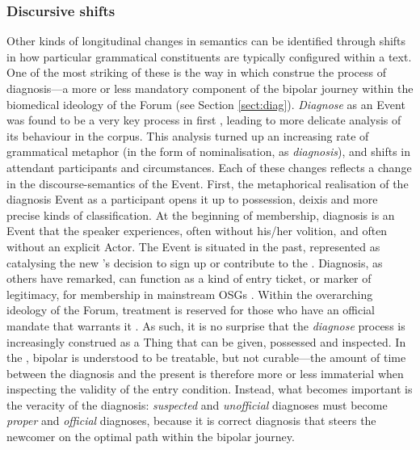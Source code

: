 \subsubsection{Discursive shifts}



Other kinds of longitudinal changes in semantics can be identified through shifts in how particular grammatical constituents are typically configured within a text. One of the most striking of these is the way in which  construe the process of diagnosis---a more or less mandatory component of the \gls{bipolar} journey within the biomedical ideology of the \gls{Forum} (see Section \ref{sect:diag}). \emph{Diagnose} as an Event was found to be a very key process in first , leading to more delicate analysis of its behaviour in the \gls{corpus}. This analysis turned up an increasing rate of grammatical metaphor (in the form of nominalisation, as \emph{diagnosis}), and shifts in attendant participants and circumstances. Each of these changes reflects a change in the \glspl{discourse-semantic} of the Event. First, the metaphorical realisation of the diagnosis Event as a participant opens it up to possession, deixis and more precise kinds of classification. At the beginning of membership, diagnosis is an Event that the speaker experiences, often without his\slash her volition, and often without an explicit Actor. The Event is situated in the past, represented as catalysing the new 's decision to sign up or contribute to the . Diagnosis, as others have remarked, can function as a kind of entry ticket, or marker of legitimacy, for membership in mainstream \glspl{OSG} \cite{stommel_use_2011}. Within the overarching ideology of the \gls{Forum}, treatment \cite[including the talk therapy provided by \gls{Forum} interaction itself---see][]{kaufman2016producing} is reserved for those who have an official mandate that warrants it \cite{vayreda_social_2009}. As such, it is no surprise that the \emph{diagnose} process is increasingly construed as a Thing that can be given, possessed and inspected. In the , \gls{bipolar} is understood to be treatable, but not curable---the amount of time between the diagnosis and the present is therefore more or less immaterial when inspecting the validity of the entry condition. Instead, what becomes important is the veracity of the diagnosis: \emph{suspected} and \emph{unofficial} diagnoses must become \emph{proper} and \emph{official} diagnoses, because it is correct diagnosis that steers the newcomer on the optimal path within the \gls{bipolar} journey.

